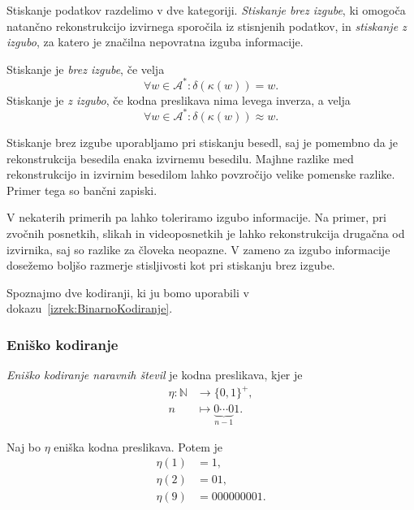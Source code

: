 \documentclass[fin1, tisk]{fmfdelo}
\newcommand{\N}{\mathbb{N}}
\newcommand{\A}{\mathcal{A}}
\theoremstyle{definition}
\begin{document}
Stiskanje podatkov razdelimo v dve kategoriji. \emph{Stiskanje brez izgube}, ki omogoča natančno
rekonstrukcijo izvirnega sporočila iz stisnjenih podatkov, in \emph{stiskanje z izgubo}, za katero
je značilna nepovratna izguba informacije.

\begin{definicija}
    Stiskanje je \emph{brez izgube}, če velja
    \[
        \forall w \in \A^* \colon \delta(\kappa(w)) = w.
    \]
    Stiskanje je \emph{z izgubo}, če kodna preslikava nima levega inverza,
    a velja
    \[
        \forall w \in \A^* \colon \delta(\kappa(w)) \approx w.
    \]
\end{definicija}

Stiskanje brez izgube uporabljamo pri stiskanju besedl, saj je pomembno da je rekonstrukcija
besedila enaka izvirnemu besedilu. Majhne razlike med rekonstrukcijo in izvirnim besedilom 
lahko povzročijo velike pomenske razlike. Primer tega so bančni zapiski.

V nekaterih primerih pa lahko toleriramo izgubo informacije. Na primer, pri zvočnih posnetkih, 
slikah in videoposnetkih je lahko rekonstrukcija drugačna od izvirnika, saj so razlike za 
človeka neopazne. V zameno za izgubo informacije dosežemo boljšo razmerje stisljivosti kot
pri stiskanju brez izgube.

Spoznajmo dve kodiranji, ki ju bomo uporabili v dokazu~\ref{izrek:BinarnoKodiranje}.

\subsubsection{Eniško kodiranje}

\begin{definicija}\label{def:eniška}%
    \emph{Eniško kodiranje naravnih števil} je kodna preslikava, kjer je 
    \begin{align*}
        \eta \colon \N &\to \{ 0, 1 \}^+, \\
        n &\mapsto \underbrace{0 \cdots 0}_{n-1}1.
    \end{align*}
\end{definicija}

\begin{primer}
    Naj bo $\eta$ eniška kodna preslikava. Potem je
    \begin{align*}
        \eta(1) &= 1, \\
        \eta(2) &= 01, \\ 
        \eta(9) &= 000000001.
    \end{align*}
\end{primer}
\end{document}
